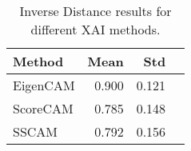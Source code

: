 \begin{table}[h]
    \centering
    \begin{tabular}{lrrr}
        \hline
        \textbf{Method} & \textbf{Mean} & \textbf{Std}\\
        \hline
        \rowcolor{yellow!20}
        EigenCAM & 0.900 & 0.121 \\
        ScoreCAM & 0.785& 0.148 \\
        SSCAM & 0.792 & 0.156 \\
        \hline
    \end{tabular}
    \caption{Inverse Distance results for different XAI methods.}
    \label{tab:xai-inverse-distance}
\end{table}